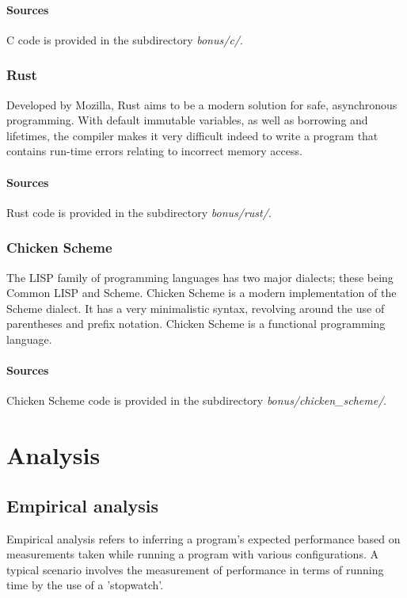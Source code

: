 \documentclass{article}
\begin{document}
\paragraph{Sources}
C code is provided in the subdirectory {\em bonus/c/}.

\subsubsection{Rust}
Developed by Mozilla, Rust aims to be a modern solution for safe, asynchronous programming.
With default immutable variables, as well as borrowing and lifetimes, the compiler makes it
very difficult indeed to write a program that contains run-time errors relating to incorrect memory access.

\paragraph{Sources}
Rust code is provided in the subdirectory {\em bonus/rust/}.

\subsubsection{Chicken Scheme}
The LISP family of programming languages has two major dialects; these being Common LISP and Scheme.
Chicken Scheme is a modern implementation of the Scheme dialect.
It has a very minimalistic syntax, revolving around the use of parentheses and prefix notation.
Chicken Scheme is a functional programming language.

\paragraph{Sources}
Chicken Scheme code is provided in the subdirectory {\em bonus/chicken\_scheme/}.


\newpage


\section{Analysis}

\subsection{Empirical analysis}
Empirical analysis refers to inferring a program's expected performance based on measurements taken while running a program with various configurations.
A typical scenario involves the measurement of performance in terms of running time by the use of a 'stopwatch'.
\end{document}
